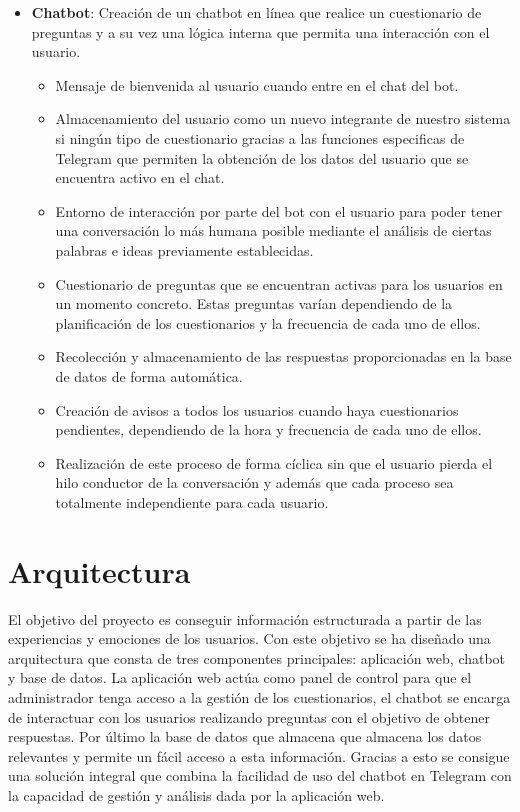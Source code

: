 \begin{itemize}
\item \textbf{Chatbot}: Creación de un chatbot en línea que realice un cuestionario de preguntas y a su vez una lógica interna que permita una interacción con el usuario.
\begin{itemize}
\item Mensaje de bienvenida al usuario cuando entre en el chat del bot.
\item Almacenamiento del usuario como un nuevo integrante de nuestro sistema si ningún tipo de cuestionario gracias a las funciones especificas de Telegram que permiten la obtención de los datos del usuario que se encuentra activo en el chat.
\item Entorno de interacción por parte del bot con el usuario para poder tener una conversación lo más humana posible mediante el análisis de ciertas palabras e ideas previamente establecidas.
\item Cuestionario de preguntas que se encuentran activas para los usuarios en un momento concreto. Estas preguntas varían dependiendo de la planificación de los cuestionarios y la frecuencia de cada uno de ellos.
\item Recolección y almacenamiento de las respuestas proporcionadas en la base de datos de forma automática.
\item Creación de avisos a todos los usuarios cuando haya cuestionarios pendientes, dependiendo de la hora y frecuencia de cada uno de ellos.
\item Realización de este proceso de forma cíclica sin que el usuario pierda el hilo conductor de la conversación y además que cada proceso sea totalmente independiente para cada usuario.
\end{itemize}
\end{itemize}

\section{Arquitectura}

El objetivo del proyecto es conseguir información estructurada a partir de las experiencias y emociones de los usuarios. Con este objetivo se ha diseñado una arquitectura que consta de tres componentes principales: aplicación web, chatbot y base de datos. La aplicación web actúa como panel de control para que el administrador tenga acceso a la gestión de los cuestionarios, el chatbot se encarga de interactuar con los usuarios realizando preguntas con el objetivo de obtener respuestas. Por último la base de datos que almacena que almacena los datos relevantes y permite un fácil acceso a esta información. Gracias a esto se consigue una solución integral que combina la facilidad de uso del chatbot en Telegram con la capacidad de gestión y análisis dada por la aplicación web.

